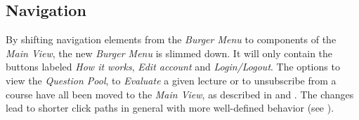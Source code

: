 \subsection{Navigation}
By shifting navigation elements from the \emph{Burger Menu} to components of the \emph{Main View}, the new \emph{Burger Menu} is slimmed down.
It will only contain the buttons labeled \emph{How it works}, \emph{Edit account} and \emph{Login/Logout}. The options to view the \emph{Question Pool}, to \emph{Evaluate} a given lecture or to unsubscribe from a course have all been moved to the \emph{Main View}, as described in   and .
The changes lead to shorter click paths in general with more well-defined behavior (see \todogrf).


